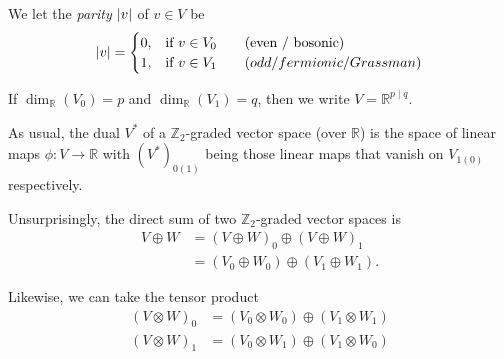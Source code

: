 \begin{definition}[parity]
  We let the \emph{parity} $\abs{v}$  of $v \in V$  be
  \begin{equation}
    \abs{v} = 
    \begin{cases}
      0, & \text{if } v \in V_0 \qquad (\text{even / bosonic}) \\
      1, & \text{if } v \in V_1 \qquad (odd / fermionic / Grassman) 
    \end{cases}
  \end{equation}
\end{definition}

\begin{notation}[]
  If $\dim_{\mathbb{R}}(V_0) = p$ and $\dim_{\mathbb{R}}(V_1) = q$, then we write $V= \mathbb{R}^{p \mid q}$.
\end{notation}

As usual, the dual $V^*$ of a $\mathbb{Z}_2$-graded vector space (over $\mathbb{R}$) is the space of linear maps $\phi \colon V \to \mathbb{R}$ with $(V^*)_{0 (1)}$ being those linear maps that vanish on $V_{1 (0)}$ respectively.

Unsurprisingly, the direct sum of two $\mathbb{Z}_2$-graded vector spaces is
\begin{align}
  V \oplus W &= (V \oplus W)_0 \oplus (V \oplus W)_1 \\
	     &= (V_0 \oplus W_0) \oplus (V_1 \oplus W_1).
\end{align}

Likewise, we can take the tensor product
\begin{align}
  (V \otimes W)_0 &= (V_0 \otimes W_0) \oplus (V_1 \otimes W_1) \\
  (V \otimes W)_1 &= (V_0 \otimes W_1) \oplus (V_1 \otimes W_0)
\end{align}

